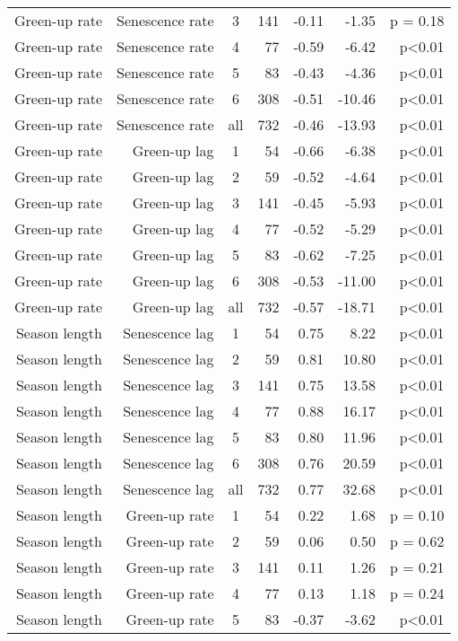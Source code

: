 \begin{table}[H]
\begin{tabular}{rrcrrrr}
  Green-up rate & Senescence rate & 3 & 141 & -0.11 & -1.35 & p = 0.18 \\ 
  Green-up rate & Senescence rate & 4 &  77 & -0.59 & -6.42 & p<0.01 \\ 
  Green-up rate & Senescence rate & 5 &  83 & -0.43 & -4.36 & p<0.01 \\ 
  Green-up rate & Senescence rate & 6 & 308 & -0.51 & -10.46 & p<0.01 \\ 
  Green-up rate & Senescence rate & all & 732 & -0.46 & -13.93 & p<0.01 \\ 
   \hline
Green-up rate & Green-up lag & 1 &  54 & -0.66 & -6.38 & p<0.01 \\ 
  Green-up rate & Green-up lag & 2 &  59 & -0.52 & -4.64 & p<0.01 \\ 
  Green-up rate & Green-up lag & 3 & 141 & -0.45 & -5.93 & p<0.01 \\ 
  Green-up rate & Green-up lag & 4 &  77 & -0.52 & -5.29 & p<0.01 \\ 
  Green-up rate & Green-up lag & 5 &  83 & -0.62 & -7.25 & p<0.01 \\ 
  Green-up rate & Green-up lag & 6 & 308 & -0.53 & -11.00 & p<0.01 \\ 
  Green-up rate & Green-up lag & all & 732 & -0.57 & -18.71 & p<0.01 \\ 
   \hline
Season length & Senescence lag & 1 &  54 & 0.75 & 8.22 & p<0.01 \\ 
  Season length & Senescence lag & 2 &  59 & 0.81 & 10.80 & p<0.01 \\ 
  Season length & Senescence lag & 3 & 141 & 0.75 & 13.58 & p<0.01 \\ 
  Season length & Senescence lag & 4 &  77 & 0.88 & 16.17 & p<0.01 \\ 
  Season length & Senescence lag & 5 &  83 & 0.80 & 11.96 & p<0.01 \\ 
  Season length & Senescence lag & 6 & 308 & 0.76 & 20.59 & p<0.01 \\ 
  Season length & Senescence lag & all & 732 & 0.77 & 32.68 & p<0.01 \\ 
   \hline
Season length & Green-up rate & 1 &  54 & 0.22 & 1.68 & p = 0.10 \\ 
  Season length & Green-up rate & 2 &  59 & 0.06 & 0.50 & p = 0.62 \\ 
  Season length & Green-up rate & 3 & 141 & 0.11 & 1.26 & p = 0.21 \\ 
  Season length & Green-up rate & 4 &  77 & 0.13 & 1.18 & p = 0.24 \\ 
  Season length & Green-up rate & 5 &  83 & -0.37 & -3.62 & p<0.01 \\ 

\end{tabular}
\end{table}
